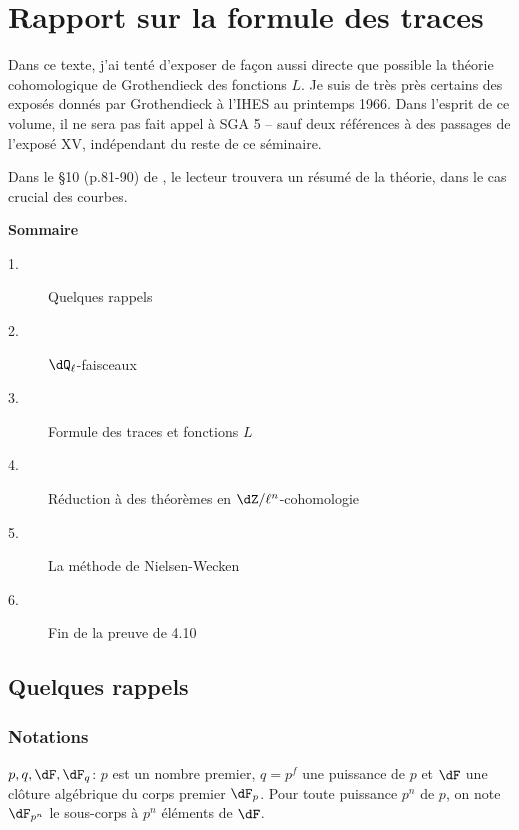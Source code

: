 
\chapter{Rapport sur la formule des traces}\label{II}

Dans ce texte, j'ai tenté d'exposer de façon aussi directe que possible la 
théorie cohomologique de Grothendieck des fonctions $L$. Je suis de très près 
certains des exposés donnés par Grothendieck à l'IHES au printemps 1966. Dans 
l'esprit de ce volume, il ne sera pas fait appel à SGA 5 -- sauf deux 
références à des passages de l'exposé XV, indépendant du reste de ce 
séminaire. 

Dans le \S 10 (p.81-90) de \cite{de73}, le lecteur trouvera un résumé de la 
théorie, dans le cas crucial des courbes. 










\begin{center}\textbf{Sommaire}\end{center}
\begin{description}
\item[1.] Quelques rappels 
\item[2.] $\dQ_\ell$-faisceaux 
\item[3.] Formule des traces et fonctions $L$ 
\item[4.] Réduction à des théorèmes en $\dZ/\ell^n$-cohomologie 
\item[5.] La méthode de Nielsen-Wecken 
\item[6.] Fin de la preuve de 4.10 
\end{description}

\section{Quelques rappels}\label{II:1}





\subsection{Notations}\label{II:1-1}

$p,q,\dF,\dF_q$: $p$ est un nombre premier, $q=p^f$ une puissance de $p$ et 
$\dF$ une clôture algébrique du corps premier $\dF_p$. Pour toute puissance 
$p^n$ de $p$, on note $\dF_{p^n}$ le sous-corps à $p^n$ éléments de $\dF$. 

